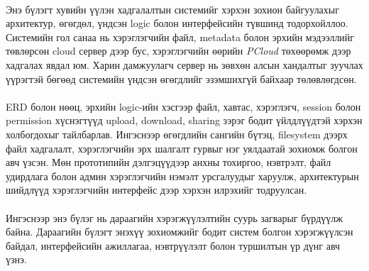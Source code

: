 \paragraph{}
Энэ бүлэгт хувийн үүлэн хадгалалтын системийг хэрхэн зохион байгуулахыг архитектур, өгөгдөл, үндсэн logic болон интерфейсийн түвшинд тодорхойллоо. Системийн гол санаа нь хэрэглэгчийн файл, metadata болон эрхийн мэдээллийг төвлөрсөн cloud сервер дээр бус, хэрэглэгчийн өөрийн \textit{PCloud} төхөөрөмж дээр хадгалах явдал юм. Харин дамжуулагч сервер нь зөвхөн алсын хандалтыг зуучлах үүрэгтэй бөгөөд системийн үндсэн өгөгдлийг эзэмшихгүй байхаар төлөвлөгдсөн.

\paragraph{}
ERD болон нөөц, эрхийн logic-ийн хэсгээр файл, хавтас, хэрэглэгч, session болон permission хүснэгтүүд upload, download, sharing зэрэг бодит үйлдлүүдтэй хэрхэн холбогдохыг тайлбарлав. Ингэснээр өгөгдлийн сангийн бүтэц, filesystem дээрх файл хадгалалт, хэрэглэгчийн эрх шалгалт гурвыг нэг уялдаатай зохиомж болгон авч үзсэн. Мөн прототипийн дэлгэцүүдээр анхны тохиргоо, нэвтрэлт, файл удирдлага болон админ хэрэглэгчийн нэмэлт урсгалуудыг харуулж, архитектурын шийдлүүд хэрэглэгчийн интерфейс дээр хэрхэн илрэхийг тодруулсан.

\paragraph{}
Ингэснээр энэ бүлэг нь дараагийн хэрэгжүүлэлтийн суурь загварыг бүрдүүлж байна. Дараагийн бүлэгт энэхүү зохиомжийг бодит систем болгон хэрэгжүүлсэн байдал, интерфейсийн ажиллагаа, нэвтрүүлэлт болон туршилтын үр дүнг авч үзнэ.
